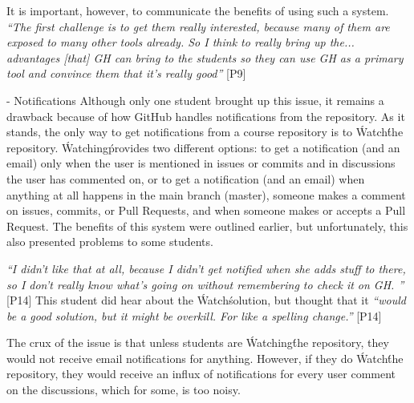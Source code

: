 It is important, however, to communicate the benefits of using such a system. \textit{``The first challenge is to get them really interested, because many of them are exposed to many other tools already. So I think to really bring up the... advantages [that] GH can bring to the students so they can use GH as a primary tool and convince them that it's really good''} [P9]

- Notifications
Although only one student brought up this issue, it remains a drawback because of how GitHub handles notifications from the repository. As it stands, the only way to get notifications from a course repository is to \'Watch\' the repository. \'Watching\' provides two different options: to get a notification (and an email) only when the user is mentioned in issues or commits and in discussions the user has commented on, or to get a notification (and an email) when anything at all happens in the main branch (master), someone makes a comment on issues, commits, or Pull Requests, and when someone makes or accepts a Pull Request. The benefits of this system were outlined earlier, but unfortunately, this also presented problems to some students.

\textit{``I didn't like that at all, because I didn't get notified when she adds stuff to there, so I don't really know what's going on without remembering to check it on GH. ''} [P14] This student did hear about the \'Watch\' solution, but thought that it \textit{``would be a good solution, but it might be overkill. For like a spelling change.''} [P14]

The crux of the issue is that unless students are \'Watching\' the repository, they would not receive email notifications for anything. However, if they do \'Watch\' the repository, they would receive an influx of notifications for every user comment on the discussions, which for some, is too noisy.



